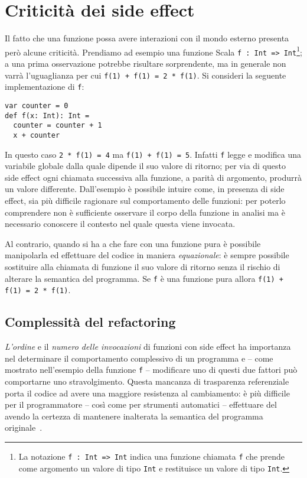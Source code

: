\section*{Criticità dei side effect}
\label{section:criticita-dei-side-effect}

Il fatto che una funzione possa avere interazioni con il mondo esterno presenta però alcune criticità.
Prendiamo ad esempio una funzione Scala \lstinline{f : Int => Int}\footnote{La notazione \lstinline{f : Int => Int} indica una funzione chiamata \lstinline{f} che prende come argomento un valore di tipo \lstinline{Int} e restituisce un valore di tipo \lstinline{Int}.}; a una prima osservazione potrebbe risultare sorprendente, ma in generale non varrà l'uguaglianza per cui \lstinline{f(1) + f(1) = 2 * f(1)}.
Si consideri la seguente implementazione di \lstinline{f}:
\begin{lstlisting}[language=scala3]
var counter = 0
def f(x: Int): Int =
  counter = counter + 1
  x + counter
\end{lstlisting}
In questo caso \lstinline{2 * f(1) = 4} ma \lstinline{f(1) + f(1) = 5}.
Infatti \lstinline{f} legge e modifica una variabile globale dalla quale dipende il suo valore di ritorno; per via di questo side effect ogni chiamata successiva alla funzione, a parità di argomento, produrrà un valore differente.
Dall'esempio è possibile intuire come, in presenza di side effect, sia più difficile ragionare sul comportamento delle funzioni: per poterlo comprendere non è sufficiente osservare il corpo della funzione in analisi ma è necessario conoscere il contesto nel quale questa viene invocata.

Al contrario, quando si ha a che fare con una funzione pura è possibile manipolarla ed effettuare  del codice in maniera \emph{equazionale}: è sempre possibile sostituire alla chiamata di funzione il suo valore di ritorno senza il rischio di alterare la semantica del programma. Se \lstinline{f} è una funzione pura allora \lstinline{f(1) + f(1) = 2 * f(1)}.

\subsection*{Complessità del refactoring}
\label{subsection:complessita-del-refactoring}
\emph{L'ordine} e il \emph{numero delle invocazioni} di funzioni con side effect ha importanza nel determinare il comportamento complessivo di un programma e -- come mostrato nell'esempio della funzione \lstinline{f} -- modificare uno di questi due fattori può comportarne uno stravolgimento.
Questa mancanza di trasparenza referenziale porta il codice ad avere una maggiore resistenza al cambiamento: è più difficile per il programmatore -- così come per strumenti automatici -- effettuare del  avendo la certezza di mantenere inalterata la semantica del programma originale~\cite{cit:towards-purity-guided-refactoring-in-java}.

